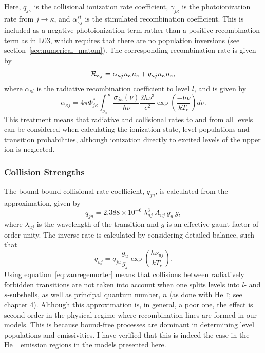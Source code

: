 Here, $q_{j \kappa}$ is the collisional ionization rate coefficient, 
$\gamma_{j \kappa}$ is the photoionization rate
from $j \rightarrow \kappa$, and $\alpha^{st}_{\kappa j}$ is the stimulated recombination
coefficient. This is included as a negative photoionization term rather 
than a positive recombination term as in L03, which requires that there are
no population inversions (see section~\ref{sec:numerical_matom}). 
The corresponding recombination rate is given by 
\begin{equation}
{\cal R}_{\kappa j} = \alpha_{\kappa j} n_{\kappa} n_e + q_{\kappa j}
n_\kappa n_e, \\
\end{equation}
where $\alpha_{\kappa l}$ is the radiative recombination coefficient
to level $l$, and is given by 
\begin{equation}
\alpha_{\kappa j} = 4\pi \Phi^*_{j\kappa} \int^\infty_{\nu_0} 
\frac{\sigma_{j\kappa} (\nu)}{h \nu} \frac{2 h \nu^3}{c^2} 
\exp \left( \frac{- h \nu}{k T_e} \right) d\nu.
\label{eq:alpha_sp}
\end{equation}
This treatment means that radiative and collisional
rates to and from all levels can be considered when calculating the
ionization state, level populations and transition probabilities, 
although ionization directly to excited levels of the upper ion is 
neglected. 

\subsubsection{Collision Strengths}
\label{sec:coll}

The bound-bound collisional rate coefficient, $q_{ju}$, is calculated from the
\cite{vanregemorter} approximation, given by
\begin{equation}
q_{ju} = 2.388 \times 10^{-6}~\lambda_{uj}^3~A_{uj}~g_u~\bar{g},
\label{eq:vanregemorter}
\end{equation}
where $\lambda_{uj}$ is the wavelength of the transition and $\bar{g}$ is 
an effective gaunt factor of order unity.
The inverse rate is calculated by considering detailed balance, 
such that
\begin{equation}
q_{uj} = q_{ju} \frac{g_u}{g_j} \exp \left( \frac{h \nu_{uj}}{k T_e} \right).
\label{eq:vanregemorter2}
\end{equation}
Using equation~\ref{eq:vanregemorter} means that collisions between radiatively
forbidden transitions are not taken into account when one 
splits levels into $l$- and $s$-subshells, as well
as principal quantum number, $n$ (as done with He~\textsc{i}; 
see chapter 4). Although this approximation is, in general, 
a poor one, the effect is second order in the physical 
regime where recombination lines are formed in our models. 
This is because bound-free processes are dominant in determining 
level populations and emissivities. I have verified that this 
is indeed the case in the He~\textsc{i} emission regions in the models
presented here.

